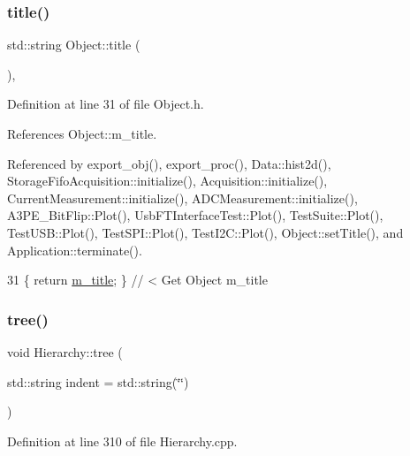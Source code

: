 \subsubsection{\texorpdfstring{title()}{title()}}
{\footnotesize\ttfamily std\+::string Object\+::title (\begin{DoxyParamCaption}{ }\end{DoxyParamCaption})\hspace{0.3cm}{\ttfamily [inline]}, {\ttfamily [inherited]}}



Definition at line 31 of file Object.\+h.



References Object\+::m\+\_\+title.



Referenced by export\+\_\+obj(), export\+\_\+proc(), Data\+::hist2d(), Storage\+Fifo\+Acquisition\+::initialize(), Acquisition\+::initialize(), Current\+Measurement\+::initialize(), A\+D\+C\+Measurement\+::initialize(), A3\+P\+E\+\_\+\+Bit\+Flip\+::\+Plot(), Usb\+F\+T\+Interface\+Test\+::\+Plot(), Test\+Suite\+::\+Plot(), Test\+U\+S\+B\+::\+Plot(), Test\+S\+P\+I\+::\+Plot(), Test\+I2\+C\+::\+Plot(), Object\+::set\+Title(), and Application\+::terminate().


\begin{DoxyCode}
31 \{ \textcolor{keywordflow}{return} \hyperlink{classObject_affbeea1953eb5163573b92fad8f75727}{m\_title};      \} \textcolor{comment}{// < Get Object m\_title}
\end{DoxyCode}
\mbox{\label{classHierarchy_a76e914b9a677a22a82deb74d892bf261}} 
\subsubsection{\texorpdfstring{tree()}{tree()}\hspace{0.1cm}{\footnotesize\ttfamily [1/2]}}
{\footnotesize\ttfamily void Hierarchy\+::tree (\begin{DoxyParamCaption}\item[{std\+::string}]{indent = {\ttfamily std\+:\+:string(\char`\"{}\char`\"{})} }\end{DoxyParamCaption})\hspace{0.3cm}{\ttfamily [inherited]}}



Definition at line 310 of file Hierarchy.\+cpp.



